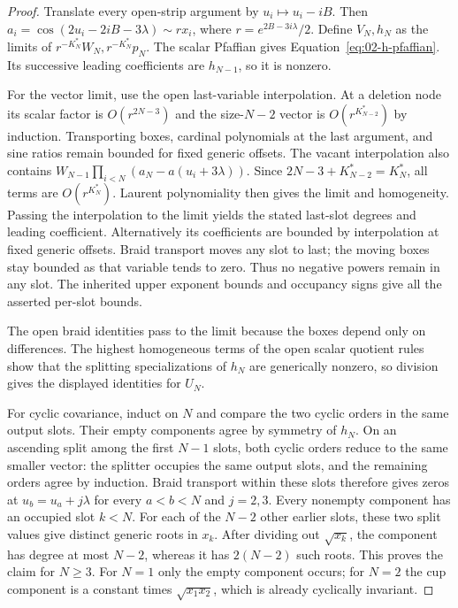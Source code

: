 \begin{proof}
Translate every open-strip argument by $u_i\mapsto u_i-iB$. Then
$a_i=\cos(2u_i-2iB-3\lambda)\sim rx_i$, where
$r=e^{2B-3i\lambda}/2$. Define $V_N,h_N$ as the limits of
$r^{-K_N^*}W_N,r^{-K_N^*}p_N$.
The scalar Pfaffian gives Equation~\eqref{eq:02-h-pfaffian}. Its
successive leading coefficients are $h_{N-1}$, so it is nonzero.

For the vector limit, use the open last-variable interpolation.
At a deletion node its scalar factor is $O(r^{2N-3})$ and the
size-$N-2$ vector is $O(r^{K_{N-2}^*})$ by induction. Transporting
boxes, cardinal polynomials at the last argument, and sine ratios
remain bounded for fixed generic offsets. The vacant interpolation
also contains
$W_{N-1}\prod_{i<N}(a_N-a(u_i+3\lambda))$.
Since $2N-3+K_{N-2}^*=K_N^*$, all terms are $O(r^{K_N^*})$.
Laurent polynomiality then gives the limit and homogeneity. Passing
the interpolation to the limit yields the stated last-slot degrees
and leading coefficient. Alternatively its coefficients are bounded
by interpolation at fixed generic offsets. Braid transport moves any
slot to last; the moving boxes stay bounded as that variable tends
to zero. Thus no negative powers remain in any slot. The inherited
upper exponent bounds and occupancy signs give all the asserted
per-slot bounds.

The open braid identities pass to the limit because the boxes depend
only on differences. The highest homogeneous terms of the open
scalar quotient rules show that the splitting specializations of
$h_N$ are generically nonzero, so division gives the displayed
identities for $U_N$.

For cyclic covariance, induct on $N$ and compare the two cyclic
orders in the same output slots. Their empty components agree by
symmetry of $h_N$. On an ascending split among the first $N-1$ slots, both cyclic
orders reduce to the same smaller vector: the splitter occupies the
same output slots, and the remaining orders agree by induction.
Braid transport within these slots therefore gives zeros at
$u_b=u_a+j\lambda$ for every $a<b<N$ and $j=2,3$.
Every nonempty component has an occupied slot $k<N$. For each of the
$N-2$ other earlier slots, these two split values give distinct generic
roots in $x_k$. After dividing out $\sqrt{x_k}$, the component has
degree at most $N-2$, whereas it has $2(N-2)$ such roots. This proves
the claim for $N\ge3$. For $N=1$ only the empty component occurs;
for $N=2$ the cup component is a constant times $\sqrt{x_1x_2}$,
which is already cyclically invariant.


\end{proof}
